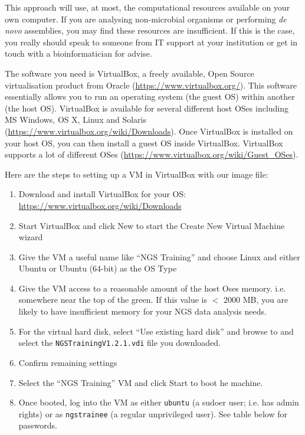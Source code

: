 This approach will use, at most, the computational resources available on
your own computer. If you are analysing non-microbial organisms or performing
\textit{de novo} assemblies, you may find these resources are insufficient. If this is the
case, you really should speak to someone from IT support at your institution or
get in touch with a bioinformatician for advise.

The software you need is VirtualBox, a freely available, Open Source
virtualisation product from Oracle (\url{https://www.virtualbox.org/}). This
software essentially allows you to run an operating system (the guest OS) within
another (the host OS). VirtualBox is available for several different host OSes
including MS Windows, OS X, Linux and Solaris
(\url{https://www.virtualbox.org/wiki/Downloads}). Once VirtualBox is installed
on your host OS, you can then install a guest OS inside VirtualBox. VirtualBox
supports a lot of different OSes
(\url{https://www.virtualbox.org/wiki/Guest_OSes}).

Here are the steps to setting up a VM in VirtualBox with our image file:
\begin{enumerate}
  \item Download and install VirtualBox for your OS: 
  \url{https://www.virtualbox.org/wiki/Downloads}
  \item Start VirtualBox and click New to start the Create New Virtual Machine wizard
  \item Give the VM a useful name like ``NGS Training'' and choose Linux and
  either Ubuntu or Ubuntu (64-bit) as the OS Type
  \item Give the VM access to a reasonable amount of the host Oses memory. i.e.
  somewhere near the top of the green. If this value is $<$ 2000 MB, you are
  likely to have insufficient memory for your NGS data analysis needs.
  \item For the virtual hard disk, select ``Use existing hard disk'' and browse
  to and select the \texttt{NGSTrainingV1.2.1.vdi} file you downloaded.
  \item Confirm remaining settings
  \item Select the ``NGS Training'' VM and click Start to boot he machine.
  \item Once booted, log into the VM as either \texttt{ubuntu} (a sudoer user;
  i.e. has admin rights) or as \texttt{ngstrainee} (a regular unprivileged
  user). See table below for passwords.
\end{enumerate}



